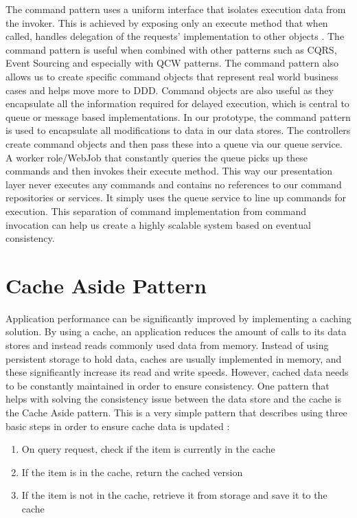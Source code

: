  The command pattern uses a uniform interface that isolates execution data from the invoker. This is achieved by exposing only an execute method that when called, handles delegation of the requests' implementation to other objects \cite{Gamma1994-ho}. The command pattern is useful when combined with other patterns such as CQRS, Event Sourcing and especially with QCW patterns. The command pattern also allows us to create specific command objects that represent real world business cases and helps move more to DDD. Command objects are also useful as they encapsulate all the information required for delayed execution, \cite{Gamma1994-ho} which is central to queue or message based implementations. In our prototype, the command pattern is used to encapsulate all modifications to data in our data stores. The controllers create command objects and then pass these into a queue via our queue service. A worker role/WebJob that constantly queries the queue picks up these commands and then invokes their execute method. This way our presentation layer never executes any commands and contains no references to our command repositories or services. It simply uses the queue service to line up commands for execution. This separation of command implementation from command invocation can help us create a highly scalable system based on eventual consistency.
 
 
 \section{Cache Aside Pattern}
  \label{sec:cache}
 Application performance can be significantly improved by implementing a caching solution. By using a cache, an application reduces the amount of calls to its data stores and instead reads commonly used data from memory. Instead of using persistent storage to hold data, caches are usually implemented in memory, and these significantly increase its read and write speeds. However, cached data needs to be constantly maintained in order to ensure consistency. One pattern that helps with solving the consistency issue between the data store and the cache is the Cache Aside pattern. This is a very simple pattern that describes using three basic steps in order to ensure cache data is updated \cite{Homer2014}:
 
    \begin{enumerate}
        \item On query request, check if the item is currently in the cache
        \item If the item is in the cache, return the cached version
        \item If the item is not in the cache, retrieve it from storage and save it to the cache
   \end{enumerate}
   
